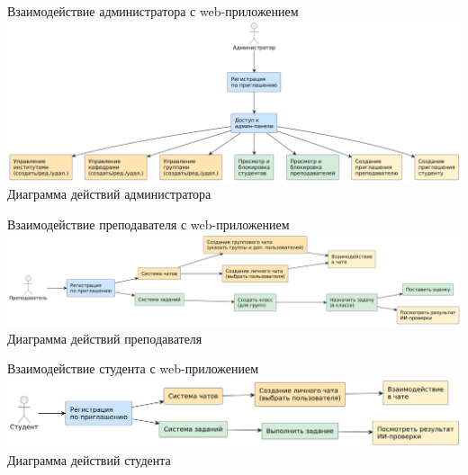 \documentclass[aspectratio=169]{beamer}
\begin{document}
\begin{frame}{Взаимодействие администратора с web-приложением}
    \centering
    \includegraphics[width=\linewidth]{static/AdminFlowchart.png}
    \vspace{0.5em}
    {\small Диаграмма действий администратора}
\end{frame}

\begin{frame}{Взаимодействие преподавателя с web-приложением}
    \centering
    \includegraphics[width=\linewidth]{static/TeacherFlowchart.png}
    \vspace{0.5em}
    {\small Диаграмма действий преподавателя}
\end{frame}

\begin{frame}{Взаимодействие студента с web-приложением}
    \centering
    \includegraphics[width=\linewidth]{static/StudentFlowchart.png}
    \vspace{0.5em}
    {\small Диаграмма действий студента}
\end{frame}


%
%
%
\end{document}
